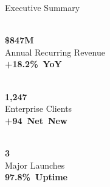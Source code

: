 \documentclass[11pt,aspectratio=169]{beamer}
\begin{document}
\begin{frame}{Executive Summary}

  \vspace{0.2cm}

  \begin{minipage}[t]{0.315\textwidth}
    \begin{tcolorbox}[summarybox]
      \centering
      {\Large\color{nxteal}\faChartBar}\\[0.25cm]
      {\Large\bfseries\color{nxnavy}\$847M}\\[0.08cm]
      {\footnotesize\color{nxgray}Annual Recurring Revenue}\\[0.02cm]
      {\small\color{nxteal}\bfseries +18.2\%\ YoY}
    \end{tcolorbox}
  \end{minipage}\hfill
  \begin{minipage}[t]{0.315\textwidth}
    \begin{tcolorbox}[summarybox]
      \centering
      {\Large\color{nxteal}\faUsers}\\[0.25cm]
      {\Large\bfseries\color{nxnavy}1,247}\\[0.08cm]
      {\footnotesize\color{nxgray}Enterprise Clients}\\[0.02cm]
      {\small\color{nxteal}\bfseries +94\ Net\ New}
    \end{tcolorbox}
  \end{minipage}\hfill
  \begin{minipage}[t]{0.315\textwidth}
    \begin{tcolorbox}[summarybox]
      \centering
      {\Large\color{nxteal}\faRocket}\\[0.25cm]
      {\Large\bfseries\color{nxnavy}3}\\[0.08cm]
      {\footnotesize\color{nxgray}Major Launches}\\[0.02cm]
      {\small\color{nxteal}\bfseries 97.8\%\ Uptime}
    \end{tcolorbox}
  \end{minipage}

  \vspace{0.5cm}


\end{frame}
\end{document}
